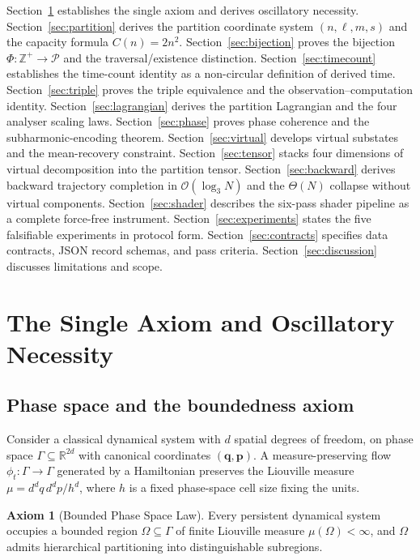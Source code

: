 \documentclass[twocolumn,10pt,a4paper]{article}
\theoremstyle{thmstyle}
\theoremstyle{definition}
\newtheorem{axiom}{Axiom}
\theoremstyle{remark}
\newcommand{\R}{\mathbb{R}}
\newcommand{\Zp}{\mathbb{Z}^{+}}
\newcommand{\Parts}{\mathcal{P}}
\newcommand{\PhiMap}{\varPhi}
\begin{document}
Section~\ref{sec:axiom} establishes the single axiom and derives
oscillatory necessity. Section~\ref{sec:partition} derives the
partition coordinate system $(n,\ell,m,s)$ and the capacity formula
$C(n)=2n^{2}$. Section~\ref{sec:bijection} proves the bijection
$\PhiMap:\Zp\to\Parts$ and the traversal/existence distinction.
Section~\ref{sec:timecount} establishes the time-count identity as a
non-circular definition of derived time.
Section~\ref{sec:triple} proves the triple equivalence and the
observation--computation identity.
Section~\ref{sec:lagrangian} derives the partition Lagrangian and the
four analyser scaling laws.
Section~\ref{sec:phase} proves phase coherence and the
subharmonic-encoding theorem.
Section~\ref{sec:virtual} develops virtual substates and the
mean-recovery constraint.
Section~\ref{sec:tensor} stacks four dimensions of virtual
decomposition into the partition tensor.
Section~\ref{sec:backward} derives backward trajectory completion in
$\mathcal{O}(\log_{3}N)$ and the $\Theta(N)$ collapse without virtual
components.
Section~\ref{sec:shader} describes the six-pass shader pipeline as a
complete force-free instrument.
Section~\ref{sec:experiments} states the five falsifiable experiments
in protocol form.
Section~\ref{sec:contracts} specifies data contracts, JSON record
schemas, and pass criteria.
Section~\ref{sec:discussion} discusses limitations and scope.

\section{The Single Axiom and Oscillatory Necessity}
\label{sec:axiom}

\subsection{Phase space and the boundedness axiom}

Consider a classical dynamical system with $d$ spatial degrees of
freedom, on phase space $\Gamma\subseteq\R^{2d}$ with canonical
coordinates $(\mathbf{q},\mathbf{p})$. A measure-preserving flow
$\phi_{t}:\Gamma\to\Gamma$ generated by a Hamiltonian preserves the
Liouville measure
$\mu=d^{d}q\,d^{d}p/h^{d}$, where $h$ is a fixed phase-space cell size
fixing the units.

\begin{axiom}[Bounded Phase Space Law]
\label{ax:bps}
Every persistent dynamical system occupies a bounded region
$\Omega\subseteq\Gamma$ of finite Liouville measure
$\mu(\Omega)<\infty$, and $\Omega$ admits hierarchical partitioning
into distinguishable subregions.
\end{axiom}
\end{document}
